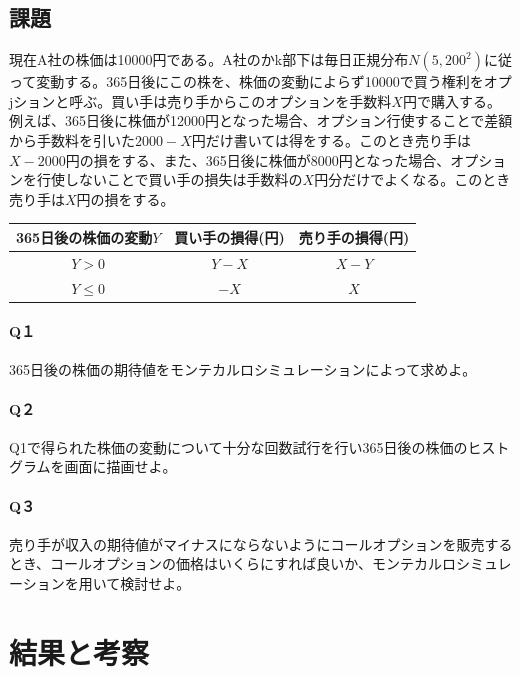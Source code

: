 \documentclass[dvipdfmx]{jsarticle}
\begin{document}
\subsection{課題}
現在A社の株価は10000円である。A社のかk部下は毎日正規分布$N(5, 200^{2})$に従って変動する。365日後にこの株を、株価の変動によらず10000で買う権利をオプjションと呼ぶ。買い手は売り手からこのオプションを手数料$X$円で購入する。例えば、365日後に株価が12000円となった場合、オプション行使することで差額から手数料を引いた$2000-X$円だけ書いては得をする。このとき売り手は$X-2000$円の損をする、また、365日後に株価が8000円となった場合、オプションを行使しないことで買い手の損失は手数料の$X$円分だけでよくなる。このとき売り手は$X$円の損をする。
\begin{table}[H]
  \begin{center}
    \begin{tabular}{|c|c|c|} \hline
      365日後の株価の変動$Y$ & 買い手の損得(円) & 売り手の損得(円) \\ \hline
      $Y > 0$ & $Y - X$ & $X - Y$ \\
      $Y \leq 0$ & $-X$ & $X$ \\ \hline
    \end{tabular}
    \label{hyo02}
  \end{center}
\end{table}
\paragraph{Q１}365日後の株価の期待値をモンテカルロシミュレーションによって求めよ。
\paragraph{Q２}Q1で得られた株価の変動について十分な回数試行を行い365日後の株価のヒストグラムを画面に描画せよ。
\paragraph{Q３}売り手が収入の期待値がマイナスにならないようにコールオプションを販売するとき、コールオプションの価格はいくらにすれば良いか、モンテカルロシミュレーションを用いて検討せよ。
\section{結果と考察}
\end{document}
